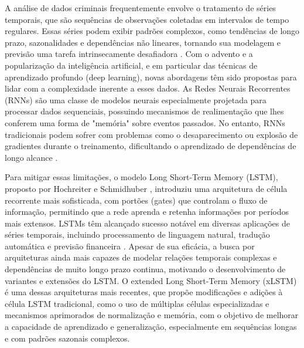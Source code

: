 \documentclass[conference]{IEEEtran}
\begin{document}
A análise de dados criminais frequentemente envolve o tratamento de séries temporais, que são sequências de observações coletadas em intervalos de tempo regulares. Essas séries podem exibir padrões complexos, como tendências de longo prazo, sazonalidades e dependências não lineares, tornando sua modelagem e previsão uma tarefa intrinsecamente desafiadora \cite{b2}. Com o advento e a popularização da inteligência artificial, e em particular das técnicas de aprendizado profundo (deep learning), novas abordagens têm sido propostas para lidar com a complexidade inerente a esses dados. As Redes Neurais Recorrentes (RNNs) são uma classe de modelos neurais especialmente projetada para processar dados sequenciais, possuindo mecanismos de realimentação que lhes conferem uma forma de "memória" sobre eventos passados. No entanto, RNNs tradicionais podem sofrer com problemas como o desaparecimento ou explosão de gradientes durante o treinamento, dificultando o aprendizado de dependências de longo alcance \cite{b3}.

Para mitigar essas limitações, o modelo Long Short-Term Memory (LSTM), proposto por Hochreiter e Schmidhuber \cite{b1}, introduziu uma arquitetura de célula recorrente mais sofisticada, com portões (gates) que controlam o fluxo de informação, permitindo que a rede aprenda e retenha informações por períodos mais extensos. LSTMs têm alcançado sucesso notável em diversas aplicações de séries temporais, incluindo processamento de linguagem natural, tradução automática e previsão financeira \cite{b6}. Apesar de sua eficácia, a busca por arquiteturas ainda mais capazes de modelar relações temporais complexas e dependências de muito longo prazo continua, motivando o desenvolvimento de variantes e extensões do LSTM. O extended Long Short-Term Memory (xLSTM) é uma dessas arquiteturas mais recentes, que propõe modificações e adições à célula LSTM tradicional, como o uso de múltiplas células especializadas e mecanismos aprimorados de normalização e memória, com o objetivo de melhorar a capacidade de aprendizado e generalização, especialmente em sequências longas e com padrões sazonais complexos.
\end{document}
